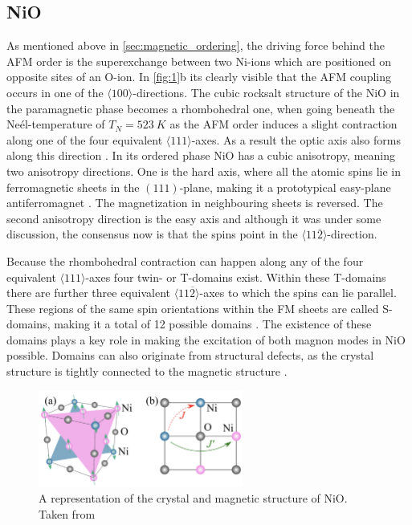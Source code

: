 \subsection{NiO}
As mentioned above in \autoref{sec:magnetic_ordering}, the driving force behind the AFM order is the superexchange between two Ni-ions which are positioned on opposite sites of an O-ion.
In \autoref{fig:1}b its clearly visible that the AFM coupling occurs in one of the $\langle100\rangle$-directions.
The cubic rocksalt structure of the NiO in the paramagnetic phase becomes a rhombohedral one, when going beneath the Neél-temperature of $T_N = \qty{523}{K}$ as the AFM order induces a slight contraction along one of the four equivalent $\langle111\rangle$-axes.
As a result the optic axis also forms along this direction \cite{rezende_introduction_2019}.
In its ordered phase NiO has a cubic anisotropy, meaning two anisotropy directions.
One is the hard axis, where all the atomic spins lie in ferromagnetic sheets in the $(111)$-plane, making it a prototypical easy-plane antiferromagnet \cite{roth_neutron_1960}.
The magnetization in neighbouring sheets is reversed.
The second anisotropy direction is the easy axis and although it was under some discussion, the consensus now is \cite{hutchings_measurement_1972} that the spins point in the $\langle11\overline{2}\rangle$-direction.

Because the rhombohedral contraction can happen along any of the four equivalent $\langle111\rangle$-axes four twin- or T-domains exist.
Within these T-domains there are further three equivalent $\langle11\overline{2}\rangle$-axes to which the spins can lie parallel.
These regions of the same spin orientations within the FM sheets are called S-domains, making it a total of 12 possible domains \cite{slack_crystallography_1960}.
The existence of these domains plays a key role in making the excitation of both magnon modes in NiO possible.
Domains can also originate from structural defects, as the crystal structure is tightly connected to the magnetic structure \cite{tanner_antiferromagnetic_1979}.
\begin{figure}[ht]
    \centering
    \includegraphics[width=0.6\textwidth]{pictures/1.png}
    \caption{A representation of the crystal and magnetic structure of NiO. Taken from \cite{betto_three-dimensional_2017}}
    \label{fig:1}
\end{figure}
\FloatBarrier

